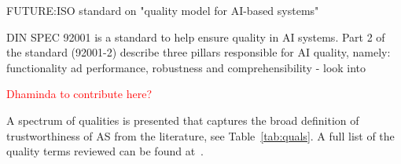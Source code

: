 FUTURE:ISO standard on "quality model for AI-based systems"


DIN SPEC 92001 is a standard to help ensure quality in AI systems. Part 2 of the standard (92001-2) describe three pillars responsible for AI quality, namely: functionality ad performance, robustness and comprehensibility - look into










\textcolor{red}{Dhaminda to contribute here?}


A spectrum of qualities is presented that captures the broad definition of trustworthiness of AS from the literature, see Table~\ref{tab:quals}. A full list of the quality terms reviewed can be found at~\cite{tsl_git}.

